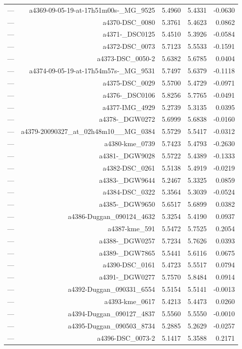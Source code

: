 \begin{table}[htbp]
\begin{tabular}{lrrrr}
— & a4369-09-05-19-at-17h51m00s-_MG_9525 & 5.4960 & 5.4331 & -0.0630 \\
— & a4370-DSC_0080 & 5.3761 & 5.4623 & 0.0862 \\
— & a4371-_DSC0125 & 5.4510 & 5.3926 & -0.0584 \\
— & a4372-DSC_0073 & 5.7123 & 5.5533 & -0.1591 \\
— & a4373-DSC_0050-2 & 5.6382 & 5.6785 & 0.0404 \\
— & a4374-09-05-19-at-17h54m57s-_MG_9531 & 5.7497 & 5.6379 & -0.1118 \\
— & a4375-DSC_0029 & 5.5700 & 5.4729 & -0.0971 \\
— & a4376-_DSC0106 & 5.8256 & 5.7765 & -0.0491 \\
— & a4377-IMG_4929 & 5.2739 & 5.3135 & 0.0395 \\
— & a4378-_DGW0272 & 5.6999 & 5.6838 & -0.0160 \\
— & a4379-20090327_at_02h48m10__MG_0384 & 5.5729 & 5.5417 & -0.0312 \\
— & a4380-kme_0739 & 5.7423 & 5.4793 & -0.2630 \\
— & a4381-_DGW9028 & 5.5722 & 5.4389 & -0.1333 \\
— & a4382-DSC_0261 & 5.5138 & 5.4919 & -0.0219 \\
— & a4383-_DGW9644 & 5.2467 & 5.3325 & 0.0859 \\
— & a4384-DSC_0322 & 5.3564 & 5.3039 & -0.0524 \\
— & a4385-_DGW9650 & 5.6517 & 5.6899 & 0.0382 \\
— & a4386-Duggan_090124_4632 & 5.3254 & 5.4190 & 0.0937 \\
— & a4387-kme_591 & 5.5472 & 5.7525 & 0.2054 \\
— & a4388-_DGW0257 & 5.7234 & 5.7626 & 0.0393 \\
— & a4389-_DGW7865 & 5.5441 & 5.6116 & 0.0675 \\
— & a4390-DSC_0161 & 5.4723 & 5.5517 & 0.0794 \\
— & a4391-_DGW0277 & 5.7570 & 5.8484 & 0.0914 \\
— & a4392-Duggan_090331_6554 & 5.5154 & 5.5141 & -0.0013 \\
— & a4393-kme_0617 & 5.4213 & 5.4473 & 0.0260 \\
— & a4394-Duggan_090127_4837 & 5.5560 & 5.5550 & -0.0010 \\
— & a4395-Duggan_090503_8734 & 5.2885 & 5.2629 & -0.0257 \\
— & a4396-DSC_0073-2 & 5.1417 & 5.3588 & 0.2171 \\

\end{tabular}
\end{table}
